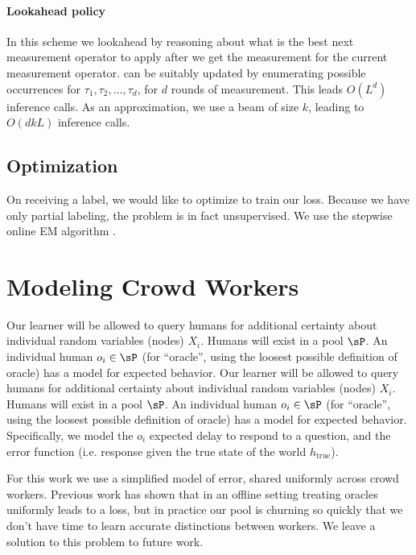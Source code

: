 \paragraph{Lookahead policy}

In this scheme we lookahead by reasoning about what is the best next measurement operator to apply after we get the measurement for the current measurement operator.
 can be suitably updated by enumerating
possible occurrences for $\tau_1, \tau_2, \dots, \tau_d$, for $d$ rounds of measurement.
This leads $O(L^d)$ inference calls.
As an approximation, we use a beam of size $k$, leading to $O(dkL)$ inference calls.

\subsection{Optimization}

On receiving a label, we would like to optimize to train our loss.
Because we have only partial labeling, the problem is in fact unsupervised.
We use the stepwise online EM algorithm \cite{liang09online}.

\section{Modeling Crowd Workers}


Our learner will be allowed to query humans for additional certainty about individual random variables (nodes) $X_i$.
 Humans will exist in a pool $\sP$.
 An individual human $o_i \in \sP$ (for ``oracle'', using the loosest possible definition of oracle) has a model for expected behavior.
Our learner will be allowed to query humans for additional certainty about individual random variables (nodes) $X_i$.
 Humans will exist in a pool $\sP$.
 An individual human $o_i \in \sP$ (for ``oracle'', using the loosest possible definition of oracle) has a model for expected behavior. Specifically, we model the $o_i$ expected delay to respond to a question, and the error function (i.e. response given the true state of the world $h_{\text{true}}$).

For this work we use a simplified model of error, shared uniformly across crowd workers.
 Previous work \cite{yan2011active} \cite{donmez2008proactive} \cite{golovin2010near} has shown that in an offline setting treating oracles uniformly leads to a loss, but in practice our pool is churning so quickly that we don't have time to learn accurate distinctions between workers.
 We leave a solution to this problem to future work.


